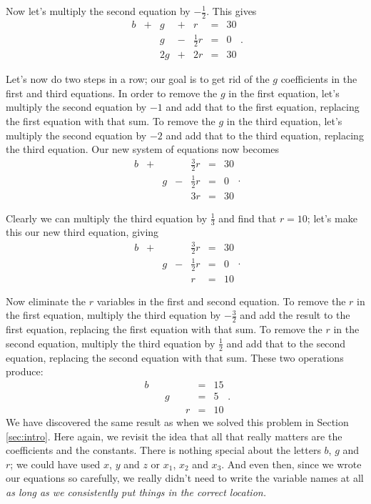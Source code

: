 Now let's multiply the second equation by $-\frac12$. This gives $$\begin{array}{JQJQJQJ}
b&+&g&+&r&=&30\\
 & & g&-&\frac{1}{2}r&=&0\\
 & &2g&+&2r&=&30
\end{array}.$$

\renewcommand{\arraystretch}{1.3}
Let's now do two steps in a row; our goal is to get rid of the $g$ coefficients in the first and third equations. In order to remove the $g$ in the first equation, let's multiply the second equation by $-1$ and add that to the first equation, replacing the first equation with that sum. To remove the $g$ in the third equation, let's multiply the second equation by $-2$ and add that to the third equation, replacing the third equation. Our new system of equations now becomes
$$\begin{array}{JQJQJQJ}
b&+& & &\frac{3}{2}r&=&30\\
 & &g&-&\frac{1}{2}r&=&0\\
 & & & &3r&=&30
\end{array}.$$

Clearly we can multiply the third equation by $\frac13$ and find that $r=10$; let's make this our new third equation, giving
$$\begin{array}{JQJQJQJ}
b&+& & &\frac{3}{2}r&=&30\\
 & &g&-&\frac{1}{2}r&=&0\\
 & & & &r&=&10
\end{array}.$$

Now eliminate the $r$ variables in the first and second equation. To remove the $r$ in the first equation, multiply the third equation by $-\frac32$ and add the result to the first equation, replacing the first equation with that sum. To remove the $r$ in the second equation, multiply the third equation by $\frac12$ and add that to the second equation, replacing the second equation with that sum. These two operations produce:
\[\begin{array}{JQJQJQJ}
b& & & & &=&15\\
 & &g& & &=&5\\
 & & & &r&=&10
\end{array}.\]
We have discovered the same result as when we solved this problem in Section \ref{sec:intro}. 
Here again, we revisit the idea that all that really matters are the coefficients and the constants. There is nothing special about the letters $b$, $g$ and $r$; we could have used $x$, $y$ and $z$ or $x_1$, $x_2$ and $x_3$. And even then, since we wrote our equations so carefully, we really didn't need to write the variable names at all \emph{as long as we consistently put things in the correct location.}

